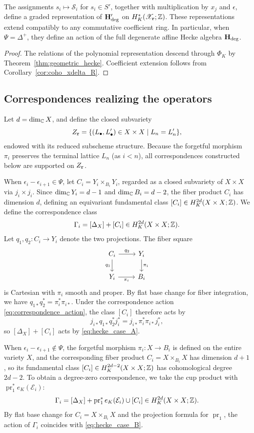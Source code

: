 \begin{corollary}\label{cor:deg_hecke_action_xdelta}
The assignments $s_i\mapsto\mathcal S_i$ for $s_i\in S'$, together with multiplication by
$x_j$ and $\epsilon$, define a graded representation of $\mathbf H_{\mathrm{deg}}'$ on $H^*_K(\mathscr X_{\mathtt r};\mathbb Z)$.
These representations extend compatibly to any commutative coefficient ring.
In particular, when $\Psi=\Delta^+$, they define an action of the full degenerate affine Hecke algebra $\mathbf H_{\mathrm{deg}}$.
\end{corollary}

\begin{proof}
The relations of the polynomial representation descend through $\Phi_K$
by Theorem~\ref{thm:geometric_hecke}. Coefficient extension follows from
Corollary~\ref{cor:coho_xdelta_R}.
\end{proof}

\subsection{Correspondences realizing the operators}

Let $d=\dim_\mathbb C X$, and define the closed subvariety
\[
  Z_{\mathtt r}=\{(L_\bullet,L'_\bullet)\in X\times X\mid L_n=L'_n\},
\]
endowed with its reduced subscheme structure.
Because the forgetful morphism $\pi_i$ preserves the terminal lattice $L_n$ (as $i<n$),
all correspondences constructed below are supported on $Z_{\mathtt r}$.

When $\epsilon_i-\epsilon_{i+1}\in\Psi$, let $C_i=Y_i\times_{B_i}Y_i$, regarded as a closed subvariety
of $X\times X$ via $j_i\times j_i$.
Since $\dim_\mathbb C Y_i=d-1$ and $\dim_\mathbb C B_i=d-2$, the fiber product $C_i$ has dimension $d$,
defining an equivariant fundamental class $[C_i]\in H_K^{2d}(X\times X;\mathbb Z)$.
We define the correspondence class
\[
  \Gamma_i=[\Delta_X]+[C_i]\in H_K^{2d}(X\times X;\mathbb Z).
\]
Let $q_1,q_2:C_i\to Y_i$ denote the two projections.
The fiber square
\[
\begin{tikzcd}
  C_i\arrow[r,"q_2"]\arrow[d,"q_1"'] & Y_i\arrow[d,"\pi_i"] \\
  Y_i\arrow[r,"\pi_i"'] & B_i
\end{tikzcd}
\]
is Cartesian with $\pi_i$ smooth and proper.
By flat base change for fiber integration, we have $q_{1*}q_2^*=\pi_i^*\pi_{i*}$.
Under the correspondence action \eqref{eq:correspondence_action}, the class $[C_i]$ therefore acts by
\[
  j_{i*}q_{1*}q_2^*j_i^*=j_{i*}\pi_i^*\pi_{i*}j_i^*,
\]
so $[\Delta_X]+[C_i]$ acts by \eqref{eq:hecke_case_A}.

When $\epsilon_i-\epsilon_{i+1}\notin\Psi$, the forgetful morphism $\pi_i:X\to B_i$ is defined on the entire variety $X$, and the corresponding
fiber product $C_i=X\times_{B_i}X$ has dimension $d+1$, so its fundamental class $[C_i]\in H_K^{2d-2}(X\times X;\mathbb Z)$ has
cohomological degree $2d-2$.
To obtain a degree-zero correspondence, we take the cup product with $\operatorname{pr}_1^*e_K(\mathcal E_i)$:
\[
  \Gamma_i=[\Delta_X]+\operatorname{pr}_1^*e_K(\mathcal E_i)\cup[C_i]\in H_K^{2d}(X\times X;\mathbb Z).
\]
By flat base change for $C_i=X\times_{B_i}X$ and the projection formula for $\operatorname{pr}_1$, the action of $\Gamma_i$ coincides with
\eqref{eq:hecke_case_B}.
